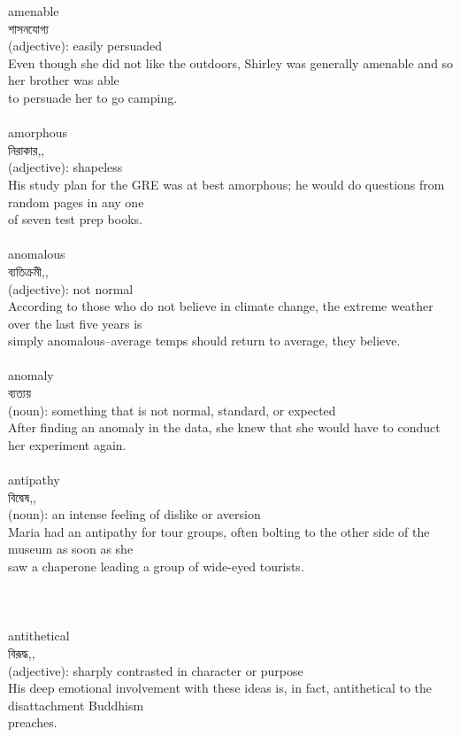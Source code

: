 \documentclass{article}
\begin{document}
{amenable}\\
{শাসনযোগ্য}\\
{(adjective): easily persuaded\\Even though she did not like the outdoors, Shirley was generally amenable and so her brother was able\\to persuade her to go camping.\\}\\
{amorphous}\\
{নিরাকার,,}\\
{(adjective): shapeless\\His study plan for the GRE was at best amorphous; he would do questions from random pages in any one\\of seven test prep books.\\}\\
{anomalous}\\
{ব্যতিক্রমী,,}\\
{(adjective): not normal\\According to those who do not believe in climate change, the extreme weather over the last five years is\\simply anomalous--average temps should return to average, they believe.\\}\\
{anomaly}\\
{ব্যত্যয়}\\
{(noun): something that is not normal, standard, or expected\\After finding an anomaly in the data, she knew that she would have to conduct her experiment again.\\}\\
{antipathy}\\
{বিদ্বেষ,,}\\
{(noun): an intense feeling of dislike or aversion\\Maria had an antipathy for tour groups, often bolting to the other side of the museum as soon as she\\saw a chaperone leading a group of wide-eyed tourists.\\\\                                                                                 \\}\\
{antithetical}\\
{বিরূদ্ধ,,}\\
{(adjective): sharply contrasted in character or purpose\\His deep emotional involvement with these ideas is, in fact, antithetical to the disattachment Buddhism\\preaches.\\}\\
\end{document}
